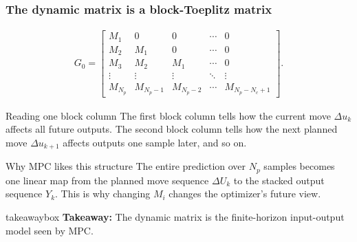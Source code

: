 \documentclass[aspectratio=169]{beamer}
\newcommand{\takeawaybox}[1]{%
\vspace{0.02cm}
\begin{center}
\begin{beamercolorbox}[wd=0.94\textwidth,sep=3pt,center,rounded=true,shadow=false]{takeawaybox}
\scriptsize
\textbf{\textcolor{maroon1}{Takeaway:}} #1
\end{beamercolorbox}
\end{center}
}
\begin{document}
\begin{frame}
\frametitle{\large \textbf{The dynamic matrix is a block-Toeplitz matrix}}
\scriptsize

\begin{align*}
G_0 =
\begin{bmatrix}
M_1 & 0 & 0 & \cdots & 0\\
M_2 & M_1 & 0 & \cdots & 0\\
M_3 & M_2 & M_1 & \cdots & 0\\
\vdots & \vdots & \vdots & \ddots & \vdots\\
M_{N_p} & M_{N_p-1} & M_{N_p-2} & \cdots & M_{N_p-N_c+1}
\end{bmatrix}.
\end{align*}

\begin{block}{Reading one block column}
The first block column tells how the current move \(\Delta u_k\) affects all future outputs. The second block column tells how the next planned move \(\Delta u_{k+1}\) affects outputs one sample later, and so on.
\end{block}

\begin{block}{Why MPC likes this structure}
The entire prediction over \(N_p\) samples becomes one linear map from the planned move sequence \(\Delta U_k\) to the stacked output sequence \(Y_k\). This is why changing \(M_i\) changes the optimizer's future view.
\end{block}

\takeawaybox{The dynamic matrix is the finite-horizon input-output model seen by MPC.}
\end{frame}
\end{document}
